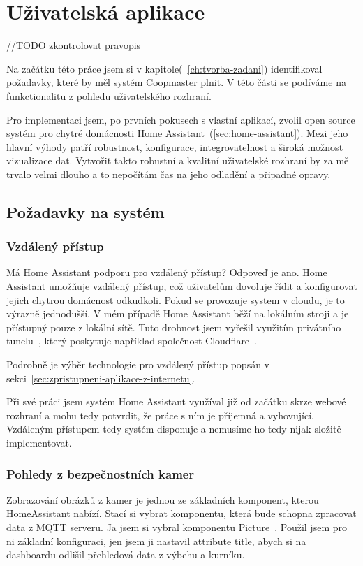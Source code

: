 \section{Uživatelská aplikace}\label{sec:tvorba-gui-rozhrani}
//TODO zkontrolovat pravopis\newline

Na začátku této práce jsem si v kapitole(~\ref{ch:tvorba-zadani}) identifikoval požadavky, které by měl systém Coopmaster plnit.
V této části se podíváme na funkctionalitu z pohledu uživatelského rozhraní.

Pro implementaci jsem, po prvních pokusech s vlastní aplikací, zvolil open source systém pro chytré domácnosti Home Assistant~(\ref{sec:home-assistant}).
Mezi jeho hlavní výhody patří robustnost, konfigurace, integrovatelnost a široká možnost vizualizace dat.
Vytvořit takto robustní a kvalitní uživatelské rozhraní by za mě trvalo velmi dlouho a to nepočítám čas na jeho odladění a připadné opravy.

\subsection{Požadavky na systém}

\subsubsection*{Vzdálený přístup}
Má Home Assistant podporu pro vzdálený přístup? Odpoveď je ano.
Home Assistant umožňuje vzdálený přístup, což uživatelům dovoluje řídit a konfigurovat jejich chytrou domácnost odkudkoli.
Pokud se provozuje system v cloudu, je to výrazně jednodušší.
V mém případě Home Assistant běží na lokálním stroji a je přístupný pouze z lokální sítě.
Tuto drobnost jsem vyřešil využitím privátního tunelu~\cite{CloudflareTunnel}, který poskytuje například společnost Cloudflare~\cite{cloudflare}.

Podrobně je výběr technologie pro vzdálený přístup popsán v sekci~\ref{sec:zpristupneni-aplikace-z-internetu}.

Při své práci jsem systém Home Assistant využíval již od začátku skrze webové rozhraní a mohu tedy potvrdit, že práce s ním je příjemná a vyhovující.
Vzdáleným přístupem tedy systém disponuje a nemusíme ho tedy nijak složitě implementovat.

\subsubsection*{Pohledy z bezpečnostních kamer}
Zobrazování obrázků z kamer je jednou ze základních komponent, kterou HomeAssistant nabízí.
Stací si vybrat komponentu, která bude schopna zpracovat data z MQTT serveru.
Ja jsem si vybral komponentu Picture~\cite{HomeAssistantPictureCard}.
Použil jsem pro ni základní konfiguraci, jen jsem ji nastavil attribute title, abych si na dashboardu odlišil přehledová data z výbehu a kurníku.

